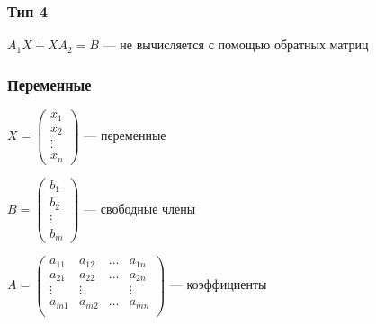 \documentclass{article}
\begin{document}
\subsubsection*{Тип 4}

$A_1 X + X A_2 = B$ --- не вычисляется с помощью обратных матриц

\subsubsection{Переменные}

$
X = \begin{pmatrix}
	x_1 \\
	x_2 \\
	\vdots \\
	x_n
\end{pmatrix}
$ --- переменные

$B = \begin{pmatrix}
	b_1 \\
	b_2 \\
	\vdots \\
	b_m
\end{pmatrix}$ --- свободные члены

$A = \begin{pmatrix}
	a_{11} & a_{12} & \dots & a_{1n} \\
	a_{21} & a_{22} & \dots & a_{2n} \\
	\vdots & \vdots & & \vdots \\
	a_{m1} & a_{m2} & \dots & a_{mn} \\
\end{pmatrix}$ --- коэффициенты
\end{document}
